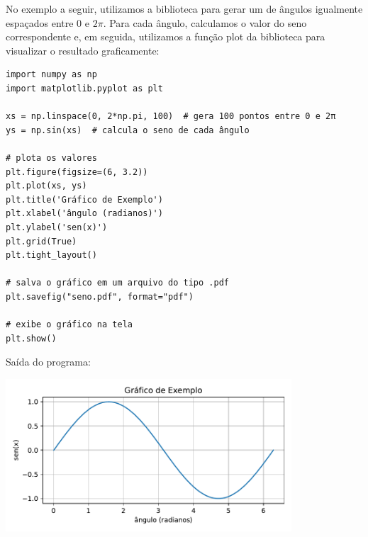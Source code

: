 No exemplo a seguir, utilizamos a biblioteca  para gerar um  de ângulos igualmente
espaçados entre 0 e $2\pi$.
Para cada ângulo, calculamos o valor do seno correspondente e, em seguida, utilizamos a função plot da
biblioteca  para visualizar o resultado graficamente:
\begin{verbatim}
import numpy as np
import matplotlib.pyplot as plt

xs = np.linspace(0, 2*np.pi, 100)  # gera 100 pontos entre 0 e 2π
ys = np.sin(xs)  # calcula o seno de cada ângulo

# plota os valores
plt.figure(figsize=(6, 3.2))
plt.plot(xs, ys)
plt.title('Gráfico de Exemplo')
plt.xlabel('ângulo (radianos)')
plt.ylabel('sen(x)')
plt.grid(True)
plt.tight_layout()

# salva o gráfico em um arquivo do tipo .pdf
plt.savefig("seno.pdf", format="pdf")

# exibe o gráfico na tela
plt.show()
\end{verbatim}

Saída do programa:
\begin{center}
    \includegraphics[width=0.8\textwidth]{figs/seno}
\end{center}
